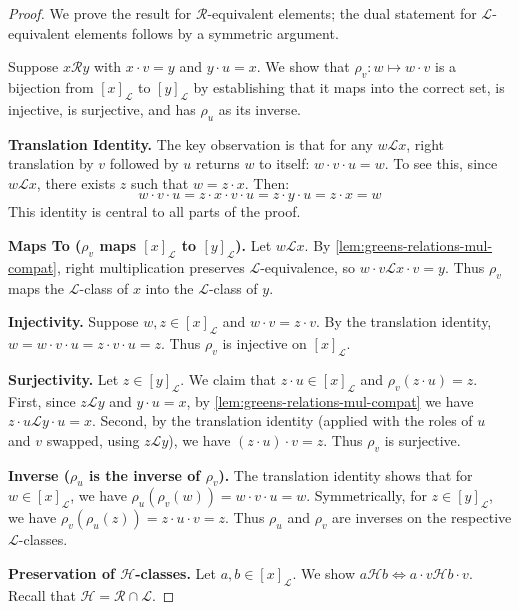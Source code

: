 \begin{proof}
\leanok
We prove the result for $\mathcal{R}$-equivalent elements; the dual statement for $\mathcal{L}$-equivalent elements follows by a symmetric argument.

Suppose $x \mathcal{R} y$ with $x \cdot v = y$ and $y \cdot u = x$. We show that $\rho_v : w \mapsto w \cdot v$ is a bijection from $[x]_{\mathcal{L}}$ to $[y]_{\mathcal{L}}$ by establishing that it maps into the correct set, is injective, is surjective, and has $\rho_u$ as its inverse.

\textbf{Translation Identity.} The key observation is that for any $w \mathcal{L} x$, right translation by $v$ followed by $u$ returns $w$ to itself: $w \cdot v \cdot u = w$. To see this, since $w \mathcal{L} x$, there exists $z$ such that $w = z \cdot x$. Then:
\[
w \cdot v \cdot u = z \cdot x \cdot v \cdot u = z \cdot y \cdot u = z \cdot x = w
\]
This identity is central to all parts of the proof.

\textbf{Maps To ($\rho_v$ maps $[x]_{\mathcal{L}}$ to $[y]_{\mathcal{L}}$).} Let $w \mathcal{L} x$. By \ref{lem:greens-relations-mul-compat}, right multiplication preserves $\mathcal{L}$-equivalence, so $w \cdot v \mathcal{L} x \cdot v = y$. Thus $\rho_v$ maps the $\mathcal{L}$-class of $x$ into the $\mathcal{L}$-class of $y$.

\textbf{Injectivity.} Suppose $w, z \in [x]_{\mathcal{L}}$ and $w \cdot v = z \cdot v$. By the translation identity, $w = w \cdot v \cdot u = z \cdot v \cdot u = z$. Thus $\rho_v$ is injective on $[x]_{\mathcal{L}}$.

\textbf{Surjectivity.} Let $z \in [y]_{\mathcal{L}}$. We claim that $z \cdot u \in [x]_{\mathcal{L}}$ and $\rho_v(z \cdot u) = z$. First, since $z \mathcal{L} y$ and $y \cdot u = x$, by \ref{lem:greens-relations-mul-compat} we have $z \cdot u \mathcal{L} y \cdot u = x$. Second, by the translation identity (applied with the roles of $u$ and $v$ swapped, using $z \mathcal{L} y$), we have $(z \cdot u) \cdot v = z$. Thus $\rho_v$ is surjective.

\textbf{Inverse ($\rho_u$ is the inverse of $\rho_v$).} The translation identity shows that for $w \in [x]_{\mathcal{L}}$, we have $\rho_u(\rho_v(w)) = w \cdot v \cdot u = w$. Symmetrically, for $z \in [y]_{\mathcal{L}}$, we have $\rho_v(\rho_u(z)) = z \cdot u \cdot v = z$. Thus $\rho_u$ and $\rho_v$ are inverses on the respective $\mathcal{L}$-classes.

\textbf{Preservation of $\mathcal{H}$-classes.} Let $a, b \in [x]_{\mathcal{L}}$. We show $a \mathcal{H} b \Leftrightarrow a \cdot v \mathcal{H} b \cdot v$. Recall that $\mathcal{H} = \mathcal{R} \cap \mathcal{L}$.


\end{proof}
